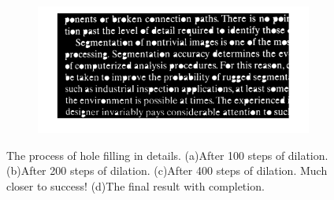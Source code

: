 \begin{figure}[h!]
	\begin{subfigure}[b]{0.45\linewidth}
    	\includegraphics[width=\linewidth]{myfigure/p8/fig0931(d).png}
    	\caption{}
    	\label{fig:0931d479}
  	\end{subfigure}
  	\caption{The process of hole filling in details. (a)After 100 steps of dilation. (b)After 200 steps of dilation. (c)After 400 steps of dilation. Much closer to success! (d)The final result with completion.}
  	\label{fig:0931append}
\end{figure}


